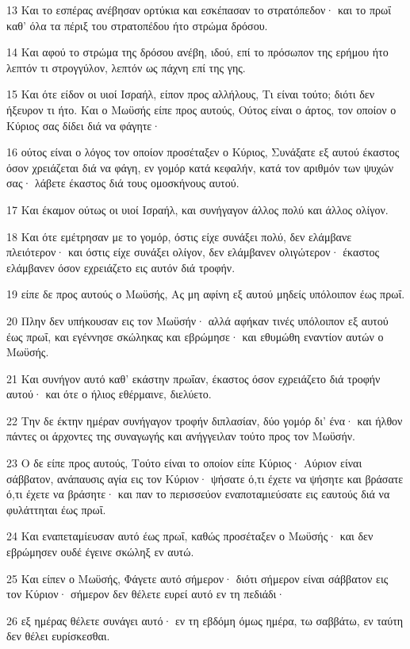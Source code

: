 \par 13 Και το εσπέρας ανέβησαν ορτύκια και εσκέπασαν το στρατόπεδον· και το πρωΐ καθ' όλα τα πέριξ του στρατοπέδου ήτο στρώμα δρόσου.
\par 14 Και αφού το στρώμα της δρόσου ανέβη, ιδού, επί το πρόσωπον της ερήμου ήτο λεπτόν τι στρογγύλον, λεπτόν ως πάχνη επί της γης.
\par 15 Και ότε είδον οι υιοί Ισραήλ, είπον προς αλλήλους, Τι είναι τούτο; διότι δεν ήξευρον τι ήτο. Και ο Μωϋσής είπε προς αυτούς, Ούτος είναι ο άρτος, τον οποίον ο Κύριος σας δίδει διά να φάγητε·
\par 16 ούτος είναι ο λόγος τον οποίον προσέταξεν ο Κύριος, Συνάξατε εξ αυτού έκαστος όσον χρειάζεται διά να φάγη, εν γομόρ κατά κεφαλήν, κατά τον αριθμόν των ψυχών σας· λάβετε έκαστος διά τους ομοσκήνους αυτού.
\par 17 Και έκαμον ούτως οι υιοί Ισραήλ, και συνήγαγον άλλος πολύ και άλλος ολίγον.
\par 18 Και ότε εμέτρησαν με το γομόρ, όστις είχε συνάξει πολύ, δεν ελάμβανε πλειότερον· και όστις είχε συνάξει ολίγον, δεν ελάμβανεν ολιγώτερον· έκαστος ελάμβανεν όσον εχρειάζετο εις αυτόν διά τροφήν.
\par 19 είπε δε προς αυτούς ο Μωϋσής, Ας μη αφίνη εξ αυτού μηδείς υπόλοιπον έως πρωΐ.
\par 20 Πλην δεν υπήκουσαν εις τον Μωϋσήν· αλλά αφήκαν τινές υπόλοιπον εξ αυτού έως πρωΐ, και εγέννησε σκώληκας και εβρώμησε· και εθυμώθη εναντίον αυτών ο Μωϋσής.
\par 21 Και συνήγον αυτό καθ' εκάστην πρωΐαν, έκαστος όσον εχρειάζετο διά τροφήν αυτού· και ότε ο ήλιος εθέρμαινε, διελύετο.
\par 22 Την δε έκτην ημέραν συνήγαγον τροφήν διπλασίαν, δύο γομόρ δι' ένα· και ήλθον πάντες οι άρχοντες της συναγωγής και ανήγγειλαν τούτο προς τον Μωϋσήν.
\par 23 Ο δε είπε προς αυτούς, Τούτο είναι το οποίον είπε Κύριος· Αύριον είναι σάββατον, ανάπαυσις αγία εις τον Κύριον· ψήσατε ό,τι έχετε να ψήσητε και βράσατε ό,τι έχετε να βράσητε· και παν το περισσεύον εναποταμιεύσατε εις εαυτούς διά να φυλάττηται έως πρωΐ.
\par 24 Και εναπεταμίευσαν αυτό έως πρωΐ, καθώς προσέταξεν ο Μωϋσής· και δεν εβρώμησεν ουδέ έγεινε σκώληξ εν αυτώ.
\par 25 Και είπεν ο Μωϋσής, Φάγετε αυτό σήμερον· διότι σήμερον είναι σάββατον εις τον Κύριον· σήμερον δεν θέλετε ευρεί αυτό εν τη πεδιάδι·
\par 26 εξ ημέρας θέλετε συνάγει αυτό· εν τη εβδόμη όμως ημέρα, τω σαββάτω, εν ταύτη δεν θέλει ευρίσκεσθαι.
